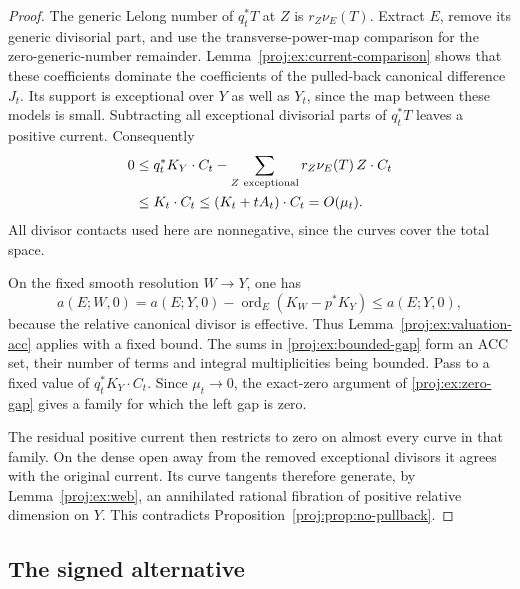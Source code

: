 \documentclass[11pt,letterpaper]{article}
\theoremstyle{definition}
\theoremstyle{remark}
\begin{document}
\begin{proof}
The generic Lelong number of \(q_t^*T\) at \(Z\) is
\(r_Z\nu_E(T)\). Extract \(E\), remove its generic
divisorial part, and use the transverse-power-map
comparison for the zero-generic-number remainder.
Lemma~\ref{proj:ex:current-comparison} shows that these
coefficients dominate the coefficients of the pulled-back
canonical difference \(J_t\). Its support is exceptional
over \(Y\) as well as \(Y_t\), since the map between these
models is small. Subtracting all exceptional divisorial
parts of \(q_t^*T\) leaves a positive current. Consequently
\begin{equation}\label{proj:ex:bounded-gap}
 \begin{split}
 0&\leq q_t^*K_Y\cdot C_t
       -\sum_{Z\ {\rm exceptional}}
                r_Z\nu_E(T)\,Z\cdot C_t\\
  &\leq K_t\cdot C_t
   \leq (K_t+tA_t)\cdot C_t
   =O(\mu_t).
 \end{split}
\end{equation}
All divisor contacts used here are nonnegative, since the
curves cover the total space.

On the fixed smooth resolution \(W\to Y\), one has
\[
 a(E;W,0)=a(E;Y,0)
       -\operatorname{ord}_E(K_W-p^*K_Y)\leq a(E;Y,0),
\]
because the relative canonical divisor is effective.
Thus Lemma~\ref{proj:ex:valuation-acc} applies with a fixed
bound. The sums in \eqref{proj:ex:bounded-gap} form an ACC
set, their number of terms and integral multiplicities
being bounded. Pass to a fixed value of
\(q_t^*K_Y\cdot C_t\). Since \(\mu_t\to0\), the
exact-zero argument of \eqref{proj:ex:zero-gap} gives a family
for which the left gap is zero.

The residual positive current then restricts to zero on
almost every curve in that family. On the dense open
away from the removed exceptional divisors it agrees
with the original current. Its curve tangents therefore
generate, by Lemma~\ref{proj:ex:web}, an annihilated rational
fibration of positive relative dimension on \(Y\).
This contradicts Proposition~\ref{proj:prop:no-pullback}.
\end{proof}

\subsection{The signed alternative}
\end{document}
